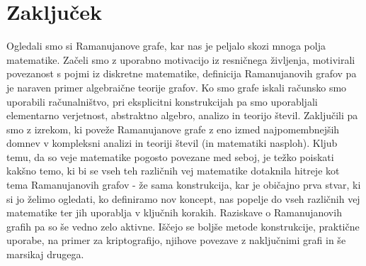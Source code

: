 \section{Zaključek}
Ogledali smo si Ramanujanove grafe, kar nas je peljalo skozi mnoga polja matematike. Začeli smo z uporabno motivacijo iz resničnega življenja, motivirali povezanost s pojmi iz diskretne matematike, definicija Ramanujanovih grafov pa je naraven primer algebraične teorije grafov. Ko smo grafe iskali računsko smo uporabili računalništvo, pri eksplicitni konstrukcijah pa smo uporabljali elementarno verjetnost, abstraktno algebro, analizo in teorijo števil. Zaključili pa smo z izrekom, ki poveže Ramanujanove grafe z eno izmed najpomembnejših domnev v kompleksni analizi in teoriji števil (in matematiki nasploh). Kljub temu, da so veje matematike pogosto povezane med seboj, je težko poiskati kakšno temo, ki bi se vseh teh različnih vej matematike dotaknila hitreje kot tema Ramanujanovih grafov - že sama konstrukcija, kar je običajno prva stvar, ki si jo želimo ogledati, ko definiramo nov koncept, nas popelje do vseh različnih vej matematike ter jih uporablja v ključnih korakih. Raziskave o Ramanujanovih grafih pa so še vedno zelo aktivne. Iščejo se boljše metode konstrukcije\cite{marcus2015interlacingfamiliesivbipartite}, praktične uporabe, na primer za kriptografijo\cite{10.1007/978-3-030-19478-9_1}, njihove povezave z naključnimi grafi\cite{huang2024ramanujanpropertyedgeuniversality} in še marsikaj drugega. 